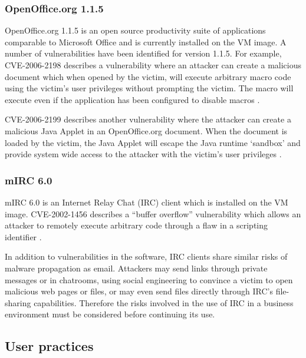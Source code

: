 \subsubsection{OpenOffice.org 1.1.5}

OpenOffice.org 1.1.5 is an open source productivity suite of applications comparable to Microsoft Office and is currently installed on the VM image. A number of vulnerabilities have been identified for version 1.1.5. For example, CVE-2006-2198 describes a vulnerability where an attacker can create a malicious document which when opened by the victim, will execute arbitrary macro code using the victim's user privileges without prompting the victim. The macro will execute even if the application has been configured to disable macros \citep{MITRE2006a}.

CVE-2006-2199 describes another vulnerability where the attacker can create a malicious Java Applet in an OpenOffice.org document. When the document is loaded by the victim, the Java Applet will escape the Java runtime `sandbox' and provide system wide access to the attacker with the victim's user privileges \citep{MITRE2006b, SecurityTracker2006}.


\subsubsection{mIRC 6.0}

mIRC 6.0 is an Internet Relay Chat (IRC) client which is installed on the VM image. CVE-2002-1456 describes a ``buffer overflow'' vulnerability which allows an attacker to remotely execute arbitrary code through a flaw in a scripting identifier \citep{MITRE2003, Martin2002}.

In addition to vulnerabilities in the software, IRC clients share similar risks of malware propagation as email. Attackers may send links through private messages or in chatrooms, using social engineering to convince a victim to open malicious web pages or files, or may even send files directly through IRC's file-sharing capabilities. Therefore the risks involved in the use of IRC in a business environment must be considered before continuing its use.

\subsection{User practices}

